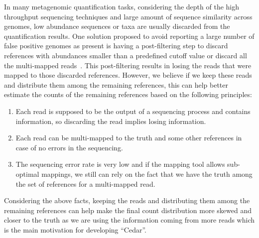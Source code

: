 In many metagenomic quantification tasks,
considering the depth of the high throughput sequencing techniques
and large amount of sequence similarity across genomes,
low abundance sequences or taxa are usually discarded from the quantification results.
One solution proposed to avoid reporting a large number of false positive genomes as present
is having a post-filtering step
to discard references with abundances smaller than a predefined cutoff value
or discard all the multi-mapped reads~\cite{bracken,karp}.
This post-filtering results in losing the reads that were mapped to those discarded references.
However, we believe if we keep these reads and distribute them among the remaining references,
this can help better estimate the counts of the remaining references
based on the following principles:
\begin{enumerate}
    \item Each read is supposed to be the output of a sequencing process and contains information,
    so discarding the read implies losing information.
    \item Each read can be multi-mapped to the truth and some other references
    in case of no errors in the sequencing.
    \item The sequencing error rate is very low and if the mapping tool allows sub-optimal mappings,
    we still can rely on the fact that we have the truth
    among the set of references for a multi-mapped read.
\end{enumerate}

Considering the above facts, keeping the reads and
distributing them among the remaining references
can help make the final count distribution more skewed and closer to the truth
as we are using the information coming from more reads
which is the main motivation for developing ``Cedar''.

